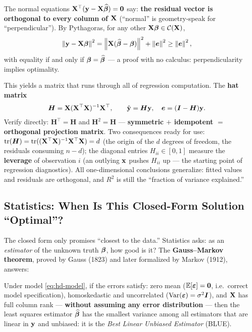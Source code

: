 The normal equations $\mathbf{X}^\top(\mathbf{y} - \mathbf{X}\widehat{\bm{\beta}}) = \mathbf{0}$ say: \textbf{the residual vector is orthogonal to every column of $\mathbf{X}$} (``normal'' is geometry-speak for ``perpendicular''). By Pythagoras, for any other $\mathbf{X}\bm{\beta} \in \mathcal{C}(\mathbf{X})$,
\[
  \left\lVert \mathbf{y} - \mathbf{X}\bm{\beta} \right\rVert^2 = \left\lVert \mathbf{X}(\widehat{\bm{\beta}} - \bm{\beta}) \right\rVert^2 + \left\lVert \bm{e} \right\rVert^2 \ge \left\lVert \bm{e} \right\rVert^2,
\]
with equality if and only if $\bm{\beta} = \widehat{\bm{\beta}}$ — a proof with no calculus: perpendicularity implies optimality.

This yields a matrix that runs through all of regression computation. The \textbf{hat matrix}
\begin{equation}\label{eq:hat}
  \bm{H} = \mathbf{X} (\mathbf{X}^\top \mathbf{X})^{-1} \mathbf{X}^\top,
  \qquad
  \hat{\mathbf{y}} = \bm{H} \mathbf{y}, \quad \bm{e} = (\bm{I} - \bm{H})\mathbf{y} .
\end{equation}
Verify directly: $\bm{H}^\top = \bm{H}$ and $\bm{H}^2 = \bm{H}$ — \textbf{symmetric $+$ idempotent $=$ orthogonal projection matrix}. Two consequences ready for use: $\mathrm{tr}(\bm{H}) = \mathrm{tr}((\mathbf{X}^\top\mathbf{X})^{-1}\mathbf{X}^\top\mathbf{X}) = d$ (the origin of the $d$ degrees of freedom, the residuals consuming $n - d$); the diagonal entries $H_{ii} \in [0,1]$ measure the \textbf{leverage} of observation $i$ (an outlying $\mathbf{x}$ pushes $H_{ii}$ up — the starting point of regression diagnostics). All one-dimensional conclusions generalize: fitted values and residuals are orthogonal, and $R^2$ is still the ``fraction of variance explained.''

\subsection{Statistics: When Is This Closed-Form Solution ``Optimal''?}\label{sec:hd-gm}

The closed form only promises ``closest to the data.'' Statistics asks: as an \textit{estimator} of the unknown truth $\bm{\beta}$, how good is it? The \textbf{Gauss--Markov theorem}, proved by Gauss (1823) and later formalized by Markov (1912), answers\cite{gauss1823}:

\begin{keybox}
Under model \eqref{eq:hd-model}, if the errors satisfy: zero mean ($\mathbb{E}[\bm{\varepsilon}] = \mathbf{0}$, i.e.\ correct model specification), homoskedastic and uncorrelated ($\mathrm{Var}(\bm{\varepsilon}) = \sigma^2 \bm{I}$), and $\mathbf{X}$ has full column rank — \textbf{without assuming any error distribution} — then the least squares estimator $\widehat{\bm{\beta}}$ has the smallest variance among all estimators that are linear in $\mathbf{y}$ and unbiased: it is the \emph{Best Linear Unbiased Estimator} (BLUE).
\end{keybox}

